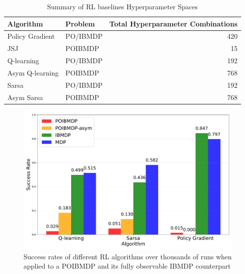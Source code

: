 \begin{table}[h]
    \centering
    \caption{Summary of RL baselines Hyperparameter Spaces}
    \begin{tabular}{llr}
    \toprule
    \textbf{Algorithm} & \textbf{Problem} & \textbf{Total Hyperparameter Combinations} \\
    \midrule
    Policy Gradient & PO/IBMDP & 420 \\
    JSJ & POIBMDP & 15 \\
    Q-learning & PO/IBMDP & 192 \\
    Asym Q-learning & POIBMDP & 768 \\
    Sarsa & PO/IBMDP & 192 \\
    Asym Sarsa & POIBMDP & 768 \\
    \bottomrule
    \end{tabular}
    \end{table}


\begin{figure}
    \centering
    \includegraphics[width=1\textwidth]{images/images_part1/algorithm_performance_comparison_flattened.pdf}
    \caption{Success rates of different RL algorithms over thousands of runs when applied to a POIBMDP and its fully observable IBMDP counterpart}\label{fig:po-vs-ib}
\end{figure}

